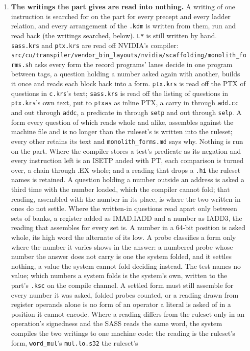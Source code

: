 \begin{enumerate}
\item \textbf{The writings the part gives are read into nothing.} A writing of one instruction is searched for on the part for every precept and every ladder relation, and every arrangement of the \texttt{.\allowbreak{}kdm} is written from them, run and read back (the writings searched, below). \texttt{L*} is still written by hand. \texttt{sass.\allowbreak{}krs} and \texttt{ptx.\allowbreak{}krs} are read off NVIDIA's compiler: \texttt{src/\allowbreak{}cu/\allowbreak{}transpiler/\allowbreak{}vendor\_\allowbreak{}bin\_\allowbreak{}layouts/\allowbreak{}nvidia/\allowbreak{}scaffolding/\allowbreak{}monolith\_\allowbreak{}forms.\allowbreak{}sh} asks every form the record programs' lanes decide in one program between tags, a question holding a number asked again with another, builds it once and reads each block back into a form. \texttt{ptx.\allowbreak{}krs} is read off the PTX of questions in \texttt{c.\allowbreak{}krs}'s text; \texttt{sass.\allowbreak{}krs} is read off the listing of questions in \texttt{ptx.\allowbreak{}krs}'s own text, put to \texttt{ptxas} as inline PTX, a carry in through \texttt{add.\allowbreak{}cc} and out through \texttt{addc}, a predicate in through \texttt{setp} and out through \texttt{selp}. A form every question of which reads whole and alike, assembles against the machine file and is no longer than the ruleset's is written into the ruleset; every other retains its text and \texttt{monolith\_\allowbreak{}forms.\allowbreak{}md} says why. Nothing is run on the part. Where the compiler stores a test's predicate as its negation and every instruction left is an ISETP anded with PT, each comparison is turned over, a chain through .EX whole; and a reading that drops a \texttt{.\allowbreak{}hi} the ruleset names is retained. A question holding a number outside an address is asked a third time with the number loaded, which the compiler cannot fold; that reading, assembled with the number in its place, is where the two written-in ones do not settle. Where the written-in questions read apart only between sets of banks, a register added as IMAD.IADD and a number as IADD3, the reading that assembles for every set is. A number in a 64-bit position is asked whole, its high word the alternate of its low. A probe classifies a form only where the number it varies shows in the answer: a numbered probe whose number the answer does not carry is one the system folded, and it settles nothing, a value the system cannot fold deciding instead. The test names no value; which numbers a system folds is the system's own, written to the part's \texttt{.\allowbreak{}ksc} on the compile channel. A settled form must still assemble for every number it was asked, folded probes counted, or a reading drawn from register operands alone is no form of an operator a literal is asked of in a position it cannot encode. Where a reading differs from the ruleset only in an operation's signedness and the SASS reads the same word, the system compiles the two writings to one machine code: the reading is the ruleset's form, \texttt{word\_\allowbreak{}mul}'s \texttt{mul.\allowbreak{}lo.\allowbreak{}s32} the ruleset's 
\end{enumerate}
